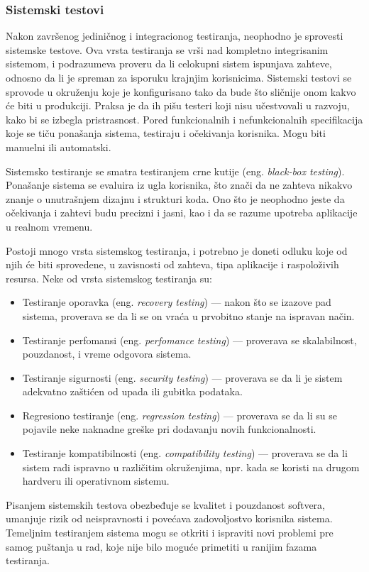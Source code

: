 \documentclass[12pt,oneside]{memoir}
\begin{document}
\subsubsection{Sistemski testovi}
\label{sec:system}
\par Nakon završenog jediničnog i integracionog testiranja, neophodno je sprovesti sistemske testove. Ova vrsta testiranja se vrši nad kompletno integrisanim sistemom, i podrazumeva proveru da li celokupni sistem ispunjava zahteve, odnosno da li je spreman za isporuku krajnjim korisnicima. Sistemski testovi se sprovode u okruženju koje je konfigurisano tako da bude što sličnije onom kakvo će biti u produkciji. Praksa je da ih pišu testeri koji nisu učestvovali u razvoju, kako bi se izbegla pristrasnost. Pored funkcionalnih i nefunkcionalnih specifikacija koje se tiču ponašanja sistema, testiraju i očekivanja korisnika. Mogu biti manuelni ili automatski. 
\par Sistemsko testiranje se smatra testiranjem crne kutije (eng. \emph{black-box testing}). Ponašanje sistema se evaluira iz ugla korisnika, što znači da ne zahteva nikakvo znanje o unutrašnjem dizajnu i strukturi koda. Ono što je neophodno jeste da očekivanja i zahtevi budu precizni i jasni, kao i da se razume upotreba aplikacije u realnom vremenu. 
\par Postoji mnogo vrsta sistemskog testiranja, i potrebno je doneti odluku koje od njih će biti sprovedene, u zavisnosti od zahteva, tipa aplikacije i raspoloživih resursa. Neke od vrsta sistemskog testiranja su: 
\begin{itemize}
\item Testiranje oporavka (eng. \emph{recovery testing}) --- nakon što se izazove pad sistema, proverava se da li se on vraća u prvobitno stanje na ispravan način.
\item Testiranje perfomansi (eng. \emph{perfomance testing}) --- proverava se skalabilnost, pouzdanost, i vreme odgovora sistema.
\item Testiranje sigurnosti (eng. \emph{security testing}) --- proverava se da li je sistem adekvatno zaštićen od upada ili gubitka podataka. 
\item Regresiono testiranje (eng. \emph{regression testing}) --- proverava se da li su se pojavile neke naknadne greške pri dodavanju novih funkcionalnosti. 
\item Testiranje kompatibilnosti (eng. \emph{compatibility testing}) --- proverava se da li sistem radi ispravno u različitim okruženjima, npr. kada se koristi na drugom hardveru ili operativnom sistemu.
\end{itemize}
\par Pisanjem sistemskih testova obezbeđuje se kvalitet i pouzdanost softvera, umanjuje rizik od neispravnosti i povećava zadovoljostvo korisnika sistema. Temeljnim testiranjem sistema mogu se otkriti i ispraviti novi problemi pre samog puštanja u rad, koje nije bilo moguće primetiti u ranijim fazama testiranja. 
\end{document}
